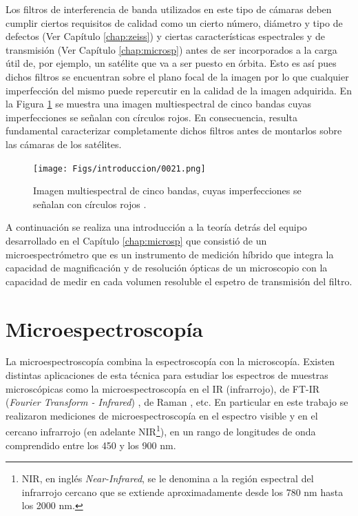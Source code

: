  Los filtros de interferencia de banda 
utilizados en este tipo de cámaras deben cumplir ciertos requisitos de calidad como un cierto número, diámetro y tipo de defectos (Ver Capítulo \ref{chap:zeiss}) y ciertas características espectrales y de transmisión (Ver Capítulo \ref{chap:microsp}) antes de ser 
incorporados a la carga útil de, por ejemplo, un satélite que va a ser puesto 
en 
órbita. Esto es así pues dichos filtros se encuentran sobre el plano focal de la imagen por lo que cualquier imperfección del mismo puede repercutir en la calidad de la imagen adquirida. En la Figura \ref{fig:speus} se muestra una imagen multiespectral de cinco bandas cuyas imperfecciones se señalan con círculos rojos. En consecuencia, resulta fundamental caracterizar completamente dichos filtros antes de montarlos sobre las cámaras de los satélites.

\begin{figure}[H]
	\centering
	\texttt{[image: Figs/introduccion/0021.png]}
	\caption{Imagen multiespectral de cinco bandas, cuyas imperfecciones se señalan con círculos rojos .}
	\label{fig:speus}
\end{figure}

A continuación se realiza una introducción a la teoría detrás del equipo desarrollado en el Capítulo \ref{chap:microsp} que consistió de un microespectrómetro que es un instrumento de medición híbrido que integra la capacidad de magnificación y de resolución ópticas de un microscopio con la capacidad de medir en cada volumen resoluble el espetro de transmisión del filtro.


\singlespacing
\section{Microespectroscopía}
\label{sec:microespp}


\hspace{0.5cm}La microespectroscopía combina la espectroscopía con la microscopía. Existen distintas aplicaciones de esta técnica para estudiar los espectros de muestras microscópicas como la microespectroscopía en el IR (infrarrojo)\cite{WALSH20071}, de FT-IR (\textit{Fourier Transform - Infrared}) \cite{kani}, de Raman \cite{defaria}, etc. En particular en este trabajo se realizaron mediciones de microespectroscopía en el espectro visible y en el cercano infrarrojo (en adelante NIR\footnote{NIR, en inglés \textit{Near-Infrared}, se le denomina a la región espectral del infrarrojo cercano que se extiende aproximadamente desde los 780 nm hasta los 2000 nm.}), en un rango de longitudes de onda comprendido entre los 450 y los 900 nm.

